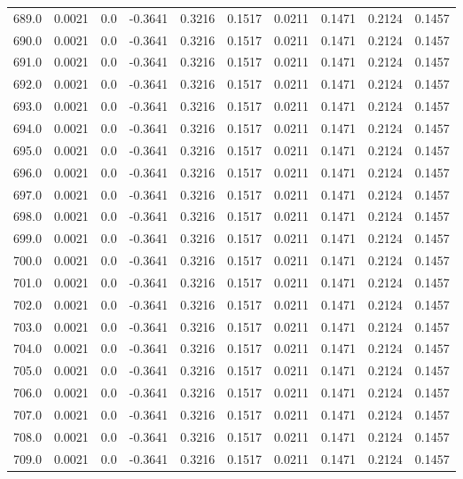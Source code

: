 \begin{longtable}{lrrrrrrrrr}
689.0 & 0.0021 & 0.0 & -0.3641 & 0.3216 & 0.1517 & 0.0211 & 0.1471 & 0.2124 & 0.1457 \\
690.0 & 0.0021 & 0.0 & -0.3641 & 0.3216 & 0.1517 & 0.0211 & 0.1471 & 0.2124 & 0.1457 \\
691.0 & 0.0021 & 0.0 & -0.3641 & 0.3216 & 0.1517 & 0.0211 & 0.1471 & 0.2124 & 0.1457 \\
692.0 & 0.0021 & 0.0 & -0.3641 & 0.3216 & 0.1517 & 0.0211 & 0.1471 & 0.2124 & 0.1457 \\
693.0 & 0.0021 & 0.0 & -0.3641 & 0.3216 & 0.1517 & 0.0211 & 0.1471 & 0.2124 & 0.1457 \\
694.0 & 0.0021 & 0.0 & -0.3641 & 0.3216 & 0.1517 & 0.0211 & 0.1471 & 0.2124 & 0.1457 \\
695.0 & 0.0021 & 0.0 & -0.3641 & 0.3216 & 0.1517 & 0.0211 & 0.1471 & 0.2124 & 0.1457 \\
696.0 & 0.0021 & 0.0 & -0.3641 & 0.3216 & 0.1517 & 0.0211 & 0.1471 & 0.2124 & 0.1457 \\
697.0 & 0.0021 & 0.0 & -0.3641 & 0.3216 & 0.1517 & 0.0211 & 0.1471 & 0.2124 & 0.1457 \\
698.0 & 0.0021 & 0.0 & -0.3641 & 0.3216 & 0.1517 & 0.0211 & 0.1471 & 0.2124 & 0.1457 \\
699.0 & 0.0021 & 0.0 & -0.3641 & 0.3216 & 0.1517 & 0.0211 & 0.1471 & 0.2124 & 0.1457 \\
700.0 & 0.0021 & 0.0 & -0.3641 & 0.3216 & 0.1517 & 0.0211 & 0.1471 & 0.2124 & 0.1457 \\
701.0 & 0.0021 & 0.0 & -0.3641 & 0.3216 & 0.1517 & 0.0211 & 0.1471 & 0.2124 & 0.1457 \\
702.0 & 0.0021 & 0.0 & -0.3641 & 0.3216 & 0.1517 & 0.0211 & 0.1471 & 0.2124 & 0.1457 \\
703.0 & 0.0021 & 0.0 & -0.3641 & 0.3216 & 0.1517 & 0.0211 & 0.1471 & 0.2124 & 0.1457 \\
704.0 & 0.0021 & 0.0 & -0.3641 & 0.3216 & 0.1517 & 0.0211 & 0.1471 & 0.2124 & 0.1457 \\
705.0 & 0.0021 & 0.0 & -0.3641 & 0.3216 & 0.1517 & 0.0211 & 0.1471 & 0.2124 & 0.1457 \\
706.0 & 0.0021 & 0.0 & -0.3641 & 0.3216 & 0.1517 & 0.0211 & 0.1471 & 0.2124 & 0.1457 \\
707.0 & 0.0021 & 0.0 & -0.3641 & 0.3216 & 0.1517 & 0.0211 & 0.1471 & 0.2124 & 0.1457 \\
708.0 & 0.0021 & 0.0 & -0.3641 & 0.3216 & 0.1517 & 0.0211 & 0.1471 & 0.2124 & 0.1457 \\
709.0 & 0.0021 & 0.0 & -0.3641 & 0.3216 & 0.1517 & 0.0211 & 0.1471 & 0.2124 & 0.1457 \\

\end{longtable}
